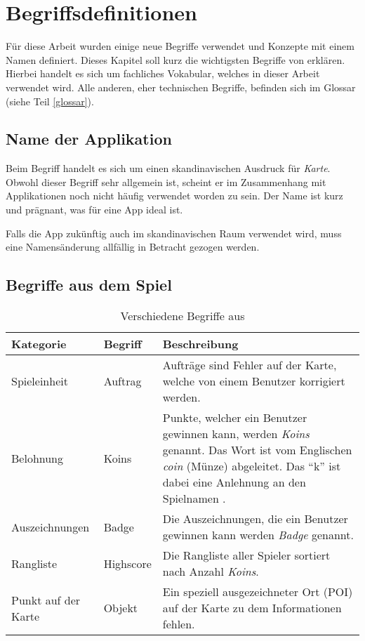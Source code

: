 \chapter{Begriffsdefinitionen}
\label{kort-definitionen}

Für diese Arbeit wurden einige neue Begriffe verwendet und Konzepte mit einem Namen definiert.
Dieses Kapitel soll kurz die wichtigsten Begriffe von \kort{} erklären.
Hierbei handelt es sich um fachliches Vokabular, welches in dieser Arbeit verwendet wird.
Alle anderen, eher technischen Begriffe, befinden sich im Glossar (siehe Teil \ref{glossar}).

\section{Name der Applikation}
Beim Begriff \kort{} handelt es sich um einen skandinavischen Ausdruck für \emph{Karte}.
Obwohl dieser Begriff sehr allgemein ist, scheint er im Zusammenhang mit Applikationen noch nicht häufig verwendet worden zu sein.
Der Name ist kurz und prägnant, was für eine App ideal ist.

Falls die App zukünftig auch im skandinavischen Raum verwendet wird, muss eine Namensänderung allfällig in Betracht gezogen werden.

\section{Begriffe aus dem Spiel}

\begin{table}[H]
\centering
\begin{tabular}{|p{0.2\threecelltabwidth}|p{0.12\threecelltabwidth}|p{0.68\threecelltabwidth}|}
\hline 
\small{\textbf{Kategorie}} & \small{\textbf{Begriff}} & \small{\textbf{Beschreibung}} \\
\hline 
Spieleinheit & Auftrag & Aufträge sind Fehler auf der Karte, welche von einem Benutzer korrigiert werden. \\
\hline 
Belohnung & Koins & Punkte, welcher ein Benutzer gewinnen kann, werden \emph{Koins} genannt.
Das Wort ist vom Englischen \emph{coin} (Münze) abgeleitet. 
Das "`k"' ist dabei eine Anlehnung an den Spielnamen \kort{}. \\
\hline 
Auszeichnungen & Badge & Die Auszeichnungen, die ein Benutzer gewinnen kann werden \emph{Badge} genannt. \\
\hline 
Rangliste & Highscore & Die Rangliste aller Spieler sortiert nach Anzahl \emph{Koins}. \\
\hline 
Punkt auf der Karte & Objekt & Ein speziell ausgezeichneter Ort (\gls{POI}) auf der Karte zu dem Informationen fehlen. \\
\hline 
\end{tabular}
\caption{Verschiedene Begriffe aus \kort{}}
\label{table-definitionen}
\end{table}